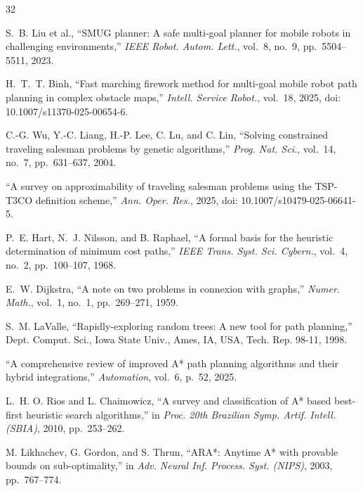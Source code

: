 \documentclass[lettersize,journal]{IEEEtran}
\begin{document}
\begin{thebibliography}{32}


S.~B. Liu et al., ``SMUG planner: A safe multi-goal planner for mobile robots in challenging environments,'' \textit{IEEE Robot. Autom. Lett.}, vol.~8, no.~9, pp.~5504--5511, 2023.


H.~T.~T. Binh, ``Fast marching firework method for multi-goal mobile robot path planning in complex obstacle maps,'' \textit{Intell. Service Robot.}, vol.~18, 2025, doi: 10.1007/s11370-025-00654-6.


C.-G. Wu, Y.-C. Liang, H.-P. Lee, C. Lu, and C. Lin, ``Solving constrained traveling salesman problems by genetic algorithms,'' \textit{Prog. Nat. Sci.}, vol.~14, no.~7, pp.~631--637, 2004.


``A survey on approximability of traveling salesman problems using the TSP-T3CO definition scheme,'' \textit{Ann. Oper. Res.}, 2025, doi: 10.1007/s10479-025-06641-5.


P.~E. Hart, N.~J. Nilsson, and B. Raphael, ``A formal basis for the heuristic determination of minimum cost paths,'' \textit{IEEE Trans. Syst. Sci. Cybern.}, vol.~4, no.~2, pp.~100--107, 1968.


E.~W. Dijkstra, ``A note on two problems in connexion with graphs,'' \textit{Numer. Math.}, vol.~1, no.~1, pp.~269--271, 1959.


S.~M. LaValle, ``Rapidly-exploring random trees: A new tool for path planning,'' Dept. Comput. Sci., Iowa State Univ., Ames, IA, USA, Tech. Rep. 98-11, 1998.


``A comprehensive review of improved A* path planning algorithms and their hybrid integrations,'' \textit{Automation}, vol.~6, p.~52, 2025.


L.~H. O. Rios and L. Chaimowicz, ``A survey and classification of A* based best-first heuristic search algorithms,'' in \textit{Proc. 20th Brazilian Symp. Artif. Intell. (SBIA)}, 2010, pp.~253--262.


M. Likhachev, G. Gordon, and S. Thrun, ``ARA*: Anytime A* with provable bounds on sub-optimality,'' in \textit{Adv. Neural Inf. Process. Syst. (NIPS)}, 2003, pp.~767--774.


\end{thebibliography}
\end{document}
